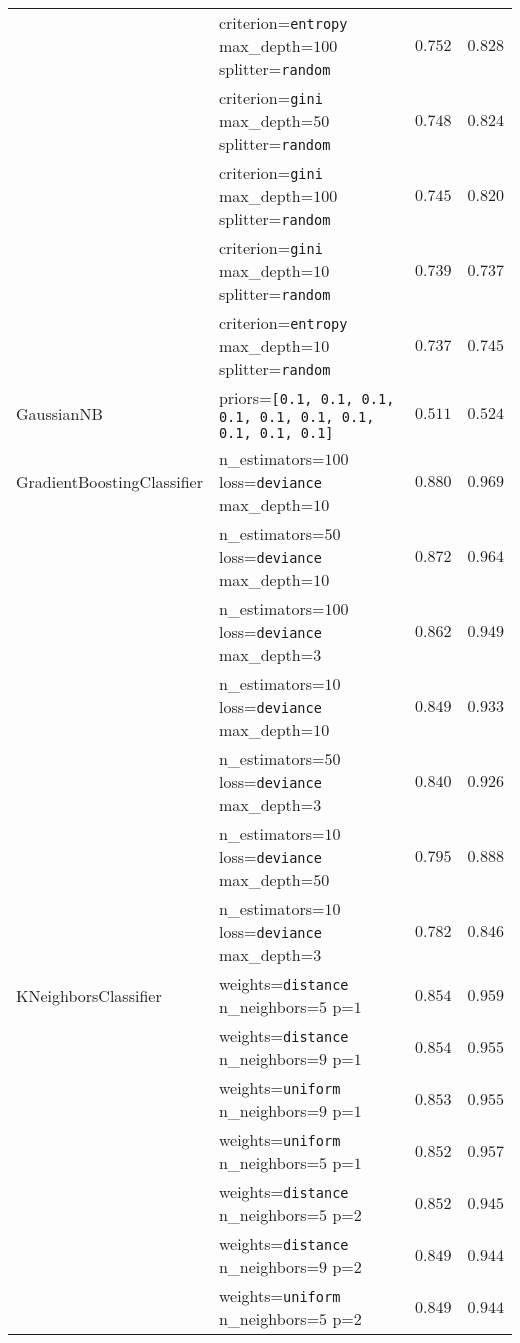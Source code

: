 \begin{longtable}{llrr}
& \tiny{criterion=\texttt{entropy} max\_depth=$100$ splitter=\texttt{random}} &$0.752$ & $0.828$\\
& \tiny{criterion=\texttt{gini} max\_depth=$50$ splitter=\texttt{random}} &$0.748$ & $0.824$\\
& \tiny{criterion=\texttt{gini} max\_depth=$100$ splitter=\texttt{random}} &$0.745$ & $0.820$\\
& \tiny{criterion=\texttt{gini} max\_depth=$10$ splitter=\texttt{random}} &$0.739$ & $0.737$\\
& \tiny{criterion=\texttt{entropy} max\_depth=$10$ splitter=\texttt{random}} &$0.737$ & $0.745$\\
\midrule
GaussianNB & \tiny{priors=\texttt{[0.1, 0.1, 0.1, 0.1, 0.1, 0.1, 0.1, 0.1, 0.1, 0.1]}} &$0.511$ & $0.524$\\
\midrule
GradientBoostingClassifier & \tiny{n\_estimators=$100$ loss=\texttt{deviance} max\_depth=$10$} &$0.880$ & $0.969$\\
& \tiny{n\_estimators=$50$ loss=\texttt{deviance} max\_depth=$10$} &$0.872$ & $0.964$\\
& \tiny{n\_estimators=$100$ loss=\texttt{deviance} max\_depth=$3$} &$0.862$ & $0.949$\\
& \tiny{n\_estimators=$10$ loss=\texttt{deviance} max\_depth=$10$} &$0.849$ & $0.933$\\
& \tiny{n\_estimators=$50$ loss=\texttt{deviance} max\_depth=$3$} &$0.840$ & $0.926$\\
& \tiny{n\_estimators=$10$ loss=\texttt{deviance} max\_depth=$50$} &$0.795$ & $0.888$\\
& \tiny{n\_estimators=$10$ loss=\texttt{deviance} max\_depth=$3$} &$0.782$ & $0.846$\\
\midrule
KNeighborsClassifier & \tiny{weights=\texttt{distance} n\_neighbors=$5$ p=$1$} &$0.854$ & $0.959$\\
& \tiny{weights=\texttt{distance} n\_neighbors=$9$ p=$1$} &$0.854$ & $0.955$\\
& \tiny{weights=\texttt{uniform} n\_neighbors=$9$ p=$1$} &$0.853$ & $0.955$\\
& \tiny{weights=\texttt{uniform} n\_neighbors=$5$ p=$1$} &$0.852$ & $0.957$\\
& \tiny{weights=\texttt{distance} n\_neighbors=$5$ p=$2$} &$0.852$ & $0.945$\\
& \tiny{weights=\texttt{distance} n\_neighbors=$9$ p=$2$} &$0.849$ & $0.944$\\
& \tiny{weights=\texttt{uniform} n\_neighbors=$5$ p=$2$} &$0.849$ & $0.944$\\

\end{longtable}
